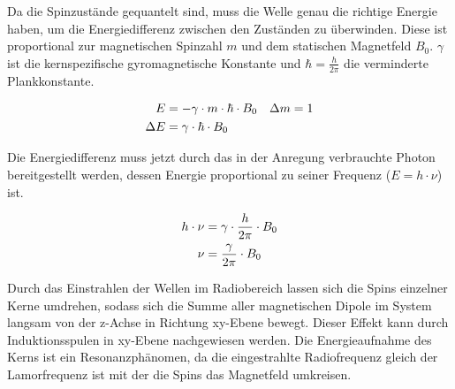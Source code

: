 Da die Spinzustände gequantelt sind, muss die Welle genau die richtige Energie haben, um die Energiedifferenz zwischen den Zuständen zu überwinden. Diese ist proportional zur magnetischen Spinzahl $m$ und dem statischen Magnetfeld $B_0$. $\gamma$ ist die kernspezifische gyromagnetische Konstante und $\hbar = \frac{h}{2 \pi}$ die verminderte Plankkonstante.~\cite[]{kaseman}

\begin{align}
  E &= - \gamma \cdot m \cdot \hbar \cdot B_0 && \Delta m = 1 \notag \\
  \Delta E &= \gamma \cdot \hbar \cdot B_0 &&
\end{align}

Die Energiedifferenz muss jetzt durch das in der Anregung verbrauchte Photon bereitgestellt werden, dessen Energie proportional zu seiner Frequenz ($ E = h \cdot \nu$) ist.

\begin{align}
  h \cdot \nu &= \gamma \cdot \frac{h}{2 \pi} \cdot B_0 \notag \\
  \nu &= \frac{\gamma}{2 \pi} \cdot B_0
  \label{alg:resonance}
\end{align}

Durch das Einstrahlen der Wellen im Radiobereich lassen sich die Spins einzelner Kerne umdrehen, sodass sich die Summe aller magnetischen Dipole im System langsam von der z-Achse in Richtung xy-Ebene bewegt. Dieser Effekt kann durch Induktionsspulen in xy-Ebene nachgewiesen werden.
Die Energieaufnahme des Kerns ist ein Resonanzphänomen, da die eingestrahlte Radiofrequenz gleich der Lamorfrequenz ist mit der die Spins das Magnetfeld umkreisen.
